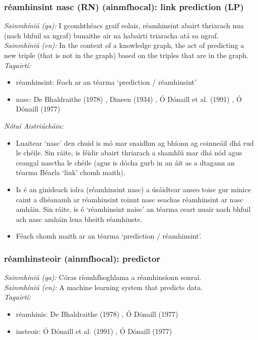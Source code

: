 \documentclass{article}
\begin{document}
\subsubsection*{réamhinsint nasc (RN) (ainmfhocal): link prediction (LP)}
 \noindent \textit{Sainmhíniú (ga):} I gcomhthéacs graif eolais, réamhinsint abairt thriarach nua (nach bhfuil sa ngraf) bunaithe air na habairtí triaracha atá sa ngraf.
\\
 \noindent \textit{Sainmhíniú (en):} In the context of a knowledge graph, the act of predicting a new triple (that is not in the graph) based on the triples that are in the graph.
\\
 \noindent \textit{Tagairtí:}
\begin{itemize}
	\item réamhinsint: féach ar an téarma `prediction / réamhinsint'
	\item nasc: De Bhaldraithe (1978) \cite{de-bhaldraithe}, Dineen (1934) \cite{dineen}, Ó Dónaill et al. (1991) \cite{focloir-beag}, Ó Dónaill (1977) \cite{odonaill}
\end{itemize}

 \noindent \textit{Nótaí Aistriúcháin:}
\begin{itemize}
	\item Luaitear `nasc' den chuid is mó mar snaidhm ag bhíonn ag coinneáil dhá rud le chéile. Sin ráite, is féidir abairt thriarach a shamhlú mar dhá nód agus ceangal nasctha le chéile (agus is dócha gurb in an áit as a dtagann an téarma Béarla `link' chomh maith).
	\item Is é an ginideach iolra (réamhinsint nasc) a úsáidtear anseo toisc gur minice caint a dhéanamh ar réamhinsint roinnt nasc seachas réamhinsint ar nasc amháin. Sin ráite, is é `réamhinsint naisc' an téarma ceart nuair nach bhfuil ach nasc amháin lena bheith réamhinste.
	\item Féach chomh maith ar an téarma `prediction / réamhinsint'.
\end{itemize}


\subsubsection*{réamhinsteoir (ainmfhocal): predictor}
 \noindent \textit{Sainmhíniú (ga):} Córas ríomhfhoghlama a réamhinsíonn sonraí.
\\
 \noindent \textit{Sainmhíniú (en):} A machine learning system that predicts data.
\\
 \noindent \textit{Tagairtí:}
\begin{itemize}
	\item réamhinis: De Bhaldraithe (1978) \cite{de-bhaldraithe}, Ó Dónaill (1977) \cite{odonaill}
	\item insteoir: Ó Dónaill et al. (1991) \cite{focloir-beag}, Ó Dónaill (1977) \cite{odonaill}
\end{itemize}
\end{document}
